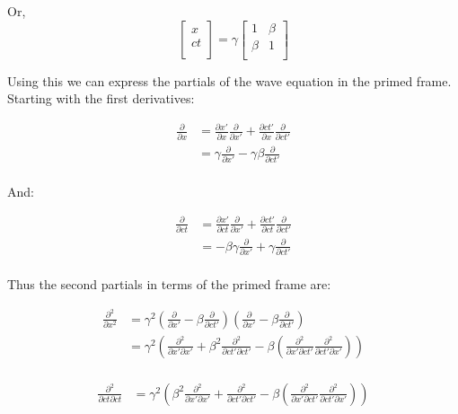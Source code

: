 \documentclass{article}      %
\begin{document}
Or,
\begin{equation*}
\begin{bmatrix}
x \\
c t \\
\end{bmatrix}
=
\gamma
\begin{bmatrix}
1 & \beta \\
\beta & 1 \\
\end{bmatrix}
\end{equation*}

Using this we can express the partials of the wave equation in the
primed frame.  Starting with the first derivatives:

\begin{align*}
\frac{\partial}{\partial x}
&= \frac{\partial x'}{\partial x} \frac{\partial}{\partial x'} + \frac{\partial c t'}{\partial x} \frac{\partial}{\partial c t'} \\
&= \gamma \frac{\partial}{\partial x'} - \gamma \beta \frac{\partial}{\partial c t'} \\
\end{align*}

And:

\begin{align*}
\frac{\partial}{\partial ct}
&= \frac{\partial x'}{\partial ct} \frac{\partial}{\partial x'} + \frac{\partial c t'}{\partial ct} \frac{\partial}{\partial c t'} \\
&= -\beta \gamma \frac{\partial}{\partial x'} + \gamma \frac{\partial}{\partial c t'} \\
\end{align*}

Thus the second partials in terms of the primed frame are:

\begin{align*}
\frac{\partial^2}{\partial x^2}
&= \gamma^2
\left(\frac{\partial}{\partial x'} - \beta \frac{\partial}{\partial c t'} \right)
\left(\frac{\partial}{\partial x'} - \beta \frac{\partial}{\partial c t'} \right)
\\
&= \gamma^2
\left(
\frac{\partial^2}{\partial x'\partial x'} + \beta^2 \frac{\partial^2}{\partial c t'\partial c t'}
- \beta \left(
\frac{\partial^2}{\partial x' \partial c t'}
\frac{\partial^2}{\partial c t' \partial x'}
\right)
\right)
\\
\end{align*}

\begin{align*}
\frac{\partial^2}{\partial ct \partial ct}
&= \gamma^2
\left(
\beta^2 \frac{\partial^2}{\partial x'\partial x'} + \frac{\partial^2}{\partial c t'\partial c t'}
- \beta \left(
\frac{\partial^2}{\partial x' \partial c t'}
\frac{\partial^2}{\partial c t' \partial x'}
\right)
\right)
\\
\end{align*}
\end{document}
